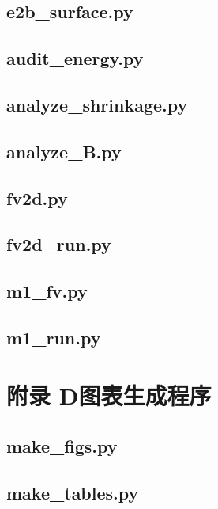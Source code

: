\documentclass[12pt,a4paper]{ctexart}
\begin{document}
\subsection*{e2b\_surface.py}


\subsection*{audit\_energy.py}


\subsection*{analyze\_shrinkage.py}


\subsection*{analyze\_B.py}


\subsection*{fv2d.py}


\subsection*{fv2d\_run.py}


\subsection*{m1\_fv.py}


\subsection*{m1\_run.py}


\newpage
\section*{附录 D\quad 图表生成程序}

\subsection*{make\_figs.py}


\subsection*{make\_tables.py}

\end{document}
